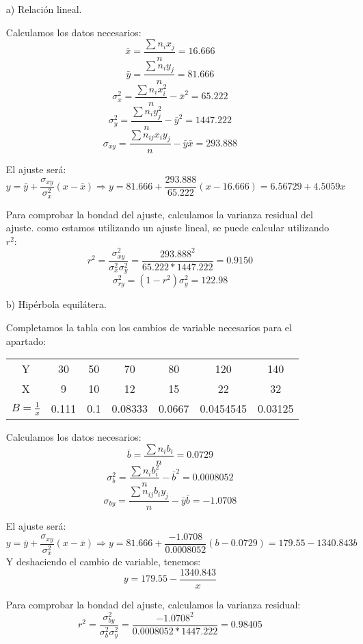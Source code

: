 \documentclass[a4paper,12pt]{article}
\begin{document}
\begin{enumerate}
    \item[a)] Relación lineal.

    Calculamos los datos necesarios:
    $$\bar x= \frac {\sum n_ix_j}{n}=16.666$$
    $$\bar y=\frac {\sum n_iy_j}{n}= 81.666$$
    $$\sigma_x^2=\frac {\sum n_ix_i^2}{n}-\bar x^2 =  65.222$$
    $$\sigma_y^2=\frac {\sum n_iy_j^2}{n}-\bar y^2 = 1447.222$$
    $$\sigma_{xy}=\frac {\sum n_{ij}x_iy_j}{n}-\bar y \bar x =  293.888$$

    El ajuste será:
    $$y= \bar y + \frac {\sigma_{xy}}{\sigma_x^2}(x-\bar x) \Rightarrow y=81.666 + \frac {293.888}{65.222}(x-16.666) = 6.56729+ 4.5059x $$
    
    Para comprobar la bondad del ajuste, calculamos la varianza residual del ajuste. como estamos utilizando un ajuste lineal, se puede calcular utilizando $r^2$: 
    $$r^2 = \frac{\sigma_{xy}^2}{\sigma_x^2\sigma_y^2}=\frac{293.888^2}{65.222*1447.222}=0.9150$$
    $$\sigma_{ry}^2=(1-r^2)\sigma_y^2=122.98$$
    
    \item[b)] Hipérbola equilátera.

    Completamos la tabla con los cambios de variable necesarios para el apartado:
    
    \begin{center}
    \begin{tabular}{c|cccccc}
    Y & 30 & 50 & 70 & 80 & 120 & 140 \\
    X & 9 & 10 & 12 & 15 & 22 & 32 \\
    \hline
    $B=\frac{1}{x}$ & 0.111 & 0.1 & 0.08333 & 0.0667 & 0.0454545 & 0.03125 \\
    \end{tabular}
    \end{center}
    
    Calculamos los datos necesarios:
    $$\bar b= \frac {\sum n_ib_i}{n}=0.0729$$
    $$\sigma_b^2=\frac {\sum n_ib_i^2}{n}-\bar b^2 =  0.0008052$$
    $$\sigma_{by}=\frac {\sum n_{ij}b_iy_j}{n}-\bar y \bar b =  -1.0708$$

    El ajuste será:
    $$y= \bar y + \frac {\sigma_{xy}}{\sigma_x^2}(x-\bar x) \Rightarrow y=81.666 + \frac { -1.0708}{0.0008052}(b-0.0729) = 179.55 -1340.843b$$
    Y deshaciendo el cambio de variable, tenemos:
    $$y=179.55 -\frac{1340.843}{x}$$
    
    Para comprobar la bondad del ajuste, calculamos la varianza residual:
    $$r^2 = \frac{\sigma_{by}^2}{\sigma_b^2\sigma_y^2}=\frac{-1.0708^2}{0.0008052*1447.222}=0.98405$$
    

\end{enumerate}
\end{document}
